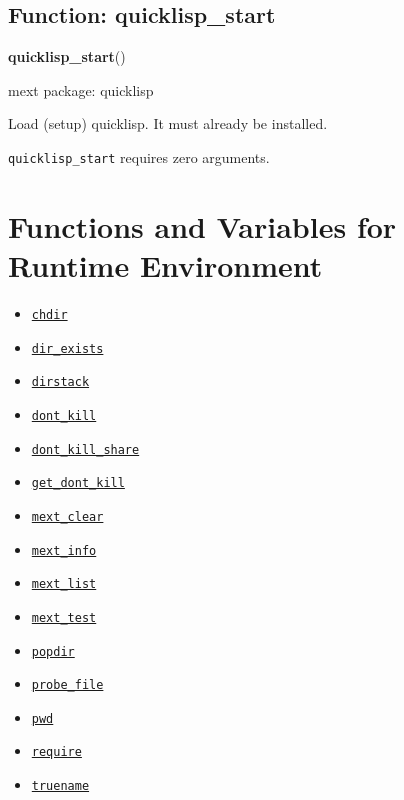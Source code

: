 \documentclass[]{article}
\begin{document}
\vspace{5 pt}


\subsection{Function: quicklisp\_start\label{sec:quicklisp_start}}
\hypertarget{quicklisp_start}{}
{\bf quicklisp\_start}()


\noindent mext package: quicklisp



\vspace{5 pt}
Load (setup) quicklisp. It must already be installed. 

\vspace{5 pt}

   {\tt quicklisp\_start} requires zero arguments.


\vspace{5 pt}


\section{Functions and Variables for Runtime Environment}
\begin{itemize}
\item \hyperlink{chdir}{{\tt chdir}}
\item \hyperlink{dir_exists}{{\tt dir\_exists}}
\item \hyperlink{dirstack}{{\tt dirstack}}
\item \hyperlink{dont_kill}{{\tt dont\_kill}}
\item \hyperlink{dont_kill_share}{{\tt dont\_kill\_share}}
\item \hyperlink{get_dont_kill}{{\tt get\_dont\_kill}}
\item \hyperlink{mext_clear}{{\tt mext\_clear}}
\item \hyperlink{mext_info}{{\tt mext\_info}}
\item \hyperlink{mext_list}{{\tt mext\_list}}
\item \hyperlink{mext_test}{{\tt mext\_test}}
\item \hyperlink{popdir}{{\tt popdir}}
\item \hyperlink{probe_file}{{\tt probe\_file}}
\item \hyperlink{pwd}{{\tt pwd}}
\item \hyperlink{require}{{\tt require}}
\item \hyperlink{truename}{{\tt truename}}
\end{itemize}
\end{document}
